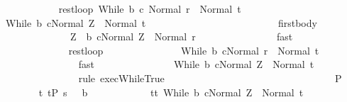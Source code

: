 \begin{isabellebody}
\ \ \ \ \ \ \ \ \ \ \isamarkupfalse%
\ rest{\isacharunderscore}loop{\isacharcolon}\ {\isachardoublequoteopen}{\isasymGamma}{\isasymturnstile}{\isasymlangle}While\ b\ c{\isacharcomma}\ Normal\ r{\isasymrangle}\ {\isasymRightarrow}\ Normal\ t{\isachardoublequoteclose}\isanewline
\ \ \ \ \ \ \ \ \ \ \isamarkupfalse%
\ {\isachardoublequoteopen}{\isasymGamma}{\isasymturnstile}{\isasymlangle}While\ b\ c{\isacharcomma}Normal\ Z{\isasymrangle}\ {\isasymRightarrow}\ Normal\ t{\isachardoublequoteclose}\isanewline
\ \ \ \ \ \ \ \ \ \ \isamarkupfalse%
\ {\isacharminus}\isanewline
\ \ \ \ \ \ \ \ \ \ \ \ \isamarkupfalse%
\ first{\isacharunderscore}body\ \isamarkupfalse%
\isanewline
\ \ \ \ \ \ \ \ \ \ \ \ \ \ {\isachardoublequoteopen}Z\ {\isasymin}\ b{\isachardoublequoteclose}\ {\isachardoublequoteopen}{\isasymGamma}{\isasymturnstile}{\isasymlangle}c{\isacharcomma}Normal\ Z{\isasymrangle}\ {\isasymRightarrow}\ Normal\ r{\isachardoublequoteclose}\isanewline
\ \ \ \ \ \ \ \ \ \ \ \ \ \ \isamarkupfalse%
\ fast\isanewline
\ \ \ \ \ \ \ \ \ \ \ \ \isamarkupfalse%
\isanewline
\ \ \ \ \ \ \ \ \ \ \ \ \isamarkupfalse%
\ rest{\isacharunderscore}loop\ \isamarkupfalse%
\isanewline
\ \ \ \ \ \ \ \ \ \ \ \ \ \ {\isachardoublequoteopen}{\isasymGamma}{\isasymturnstile}{\isasymlangle}While\ b\ c{\isacharcomma}Normal\ r{\isasymrangle}\ {\isasymRightarrow}\ Normal\ t{\isachardoublequoteclose}\isanewline
\ \ \ \ \ \ \ \ \ \ \ \ \ \ \isamarkupfalse%
\ fast\isanewline
\ \ \ \ \ \ \ \ \ \ \ \ \isamarkupfalse%
\ \isamarkupfalse%
\ {\isachardoublequoteopen}{\isasymGamma}{\isasymturnstile}{\isasymlangle}While\ b\ c{\isacharcomma}Normal\ Z{\isasymrangle}\ {\isasymRightarrow}\ Normal\ t{\isachardoublequoteclose}\isanewline
\ \ \ \ \ \ \ \ \ \ \ \ \ \ \isamarkupfalse%
\ {\isacharparenleft}rule\ exec{\isachardot}WhileTrue{\isacharparenright}\isanewline
\ \ \ \ \ \ \ \ \ \ \isamarkupfalse%
\isanewline
\ \ \ \ \ \ \ \ \isamarkupfalse%
\isanewline
\ \ \ \ \ \ \isacommand{{\isacharbraceright}}\isamarkupfalse%
\isanewline
\ \ \ \ \ \ \isamarkupfalse%
\ P\isanewline
\ \ \ \ \ \ \isamarkupfalse%
\ {\isachardoublequoteopen}{\isasymforall}t{\isachardot}\ t{\isasymin}{\isacharparenleft}{\isacharquery}P{\isacharprime}\ s\ {\isasyminter}\ {\isacharminus}\ b{\isacharparenright}\isanewline
\ \ \ \ \ \ \ \ \ \ \ \ {\isasymlongrightarrow}t{\isasymin}{\isacharbraceleft}t{\isachardot}\ {\isasymGamma}{\isasymturnstile}{\isasymlangle}While\ b\ c{\isacharcomma}Normal\ Z{\isasymrangle}\ {\isasymRightarrow}\ Normal\ t{\isacharbraceright}{\isachardoublequoteclose}\isanewline

\end{isabellebody}
